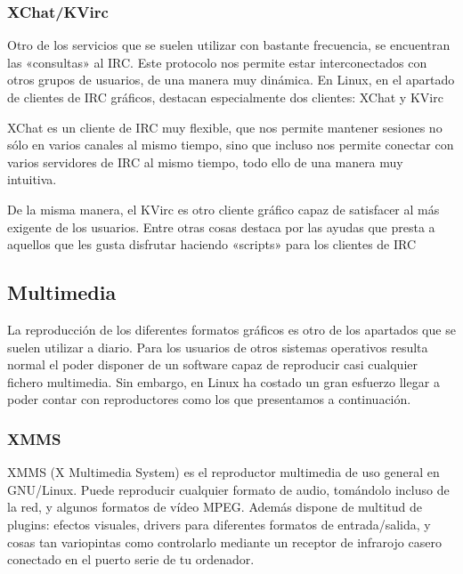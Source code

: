 \subsubsection*{XChat/KVirc}

Otro de los servicios que  se suelen utilizar con bastante frecuencia,
se encuentran las «consultas» al IRC. Este protocolo nos permite estar
interconectados  con  otros grupos  de  usuarios,  de una  manera  muy
dinámica.  En Linux,  en  el  apartado de  clientes  de IRC  gráficos,
destacan especialmente dos clientes: {\sf XChat} y {\sf KVirc}

{\sf  XChat} es  un  cliente  de IRC  muy  flexible,  que nos  permite
mantener sesiones no sólo en varios  canales al mismo tiempo, sino que
incluso nos  permite conectar  con varios servidores  de IRC  al mismo
tiempo, todo ello de una manera muy intuitiva.


De la  misma manera, el {\sf  KVirc} es otro cliente  gráfico capaz de
satisfacer al más exigente de  los usuarios. Entre otras cosas destaca
por las ayudas que presta a  aquellos que les gusta disfrutar haciendo
«scripts» para los clientes de IRC

\subsection{Multimedia}

La reproducción  de los  diferentes formatos gráficos  es otro  de los
apartados que se suelen utilizar a  diario. Para los usuarios de otros
sistemas operativos  resulta normal el  poder disponer de  un software
capaz de  reproducir casi  cualquier fichero multimedia.  Sin embargo,
en  Linux ha  costado  un  gran esfuerzo  llegar  a  poder contar  con
reproductores como los que presentamos a continuación.

\subsubsection*{XMMS}

{\sf XMMS (X  Multimedia System)} es el reproductor  multimedia de uso
general  en GNU/Linux.  Puede reproducir  cualquier formato  de audio,
tomándolo incluso de la red, y  algunos formatos de vídeo MPEG. Además
dispone  de  multitud  de  plugins:  efectos  visuales,  drivers  para
diferentes formatos  de entrada/salida,  y cosas tan  variopintas como
controlarlo mediante un  receptor de infrarojo casero  conectado en el
puerto serie de tu ordenador.

